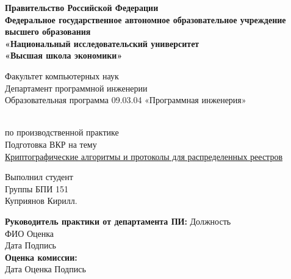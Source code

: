 \documentclass[russian, a4paper, 12pt]{article}
\begin{document}
\thispagestyle{empty}

\begin{center}
	\textbf{
		Правительство Российской Федерации\\
		Федеральное государственное автономное образовательное учреждение\\
		высшего образования\\
		«Национальный исследовательский университет\\
	«Высшая школа экономики» }

	\begin{center}  Факультет компьютерных наук\\
		Департамент  программной инженерии\\
		Образовательная программа 09.03.04 «Программная инженерия»
	\end{center}


	{}\\
	по производственной практике\\
    Подготовка ВКР на тему\\
    \underline{Криптографические алгоритмы и протоколы для распределенных реестров}
\end{center}
\begin{flushright}
	Выполнил студент \\
	Группы БПИ 151\\
	Куприянов Кирилл.
\end{flushright}
\textbf{Руководитель практики от департамента ПИ:}
\newline
\newline
Должность \underline{\hspace{15cm}}\\
\newline
ФИО \underline{\hspace{8cm}}\hspace{0.3cm}
Оценка \underline{\hspace{6.2cm}}\\
\newline
Дата \underline{\hspace{4cm}}\hspace{4.35cm}
Подпись \underline{\hspace{6cm}}
\\
\textbf{Оценка комиссии:}\\
Дата \underline{\hspace{2cm}}\hspace{2.35cm}
Оценка \underline{\hspace{1cm}}\hspace{1.35cm}
Подпись \underline{\hspace{6cm}}
\end{document}
